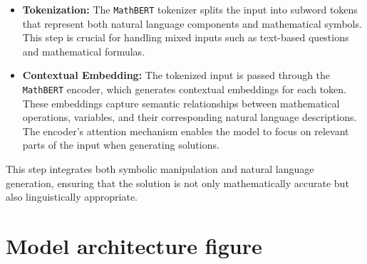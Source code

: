\documentclass{article}
\begin{document}
\begin{itemize}
    \item \textbf{Tokenization:} The \texttt{MathBERT} tokenizer splits the input into subword tokens that represent both natural language components and mathematical symbols. This step is crucial for handling mixed inputs such as text-based questions and mathematical formulas.
    \item \textbf{Contextual Embedding:} The tokenized input is passed through the \texttt{MathBERT} encoder, which generates contextual embeddings for each token. These embeddings capture semantic relationships between mathematical operations, variables, and their corresponding natural language descriptions. The encoder's attention mechanism enables the model to focus on relevant parts of the input when generating solutions.
\end{itemize}




This step integrates both symbolic manipulation and natural language generation, ensuring that the solution is not only mathematically accurate but also linguistically appropriate.

\section{Model architecture figure}
\end{document}
